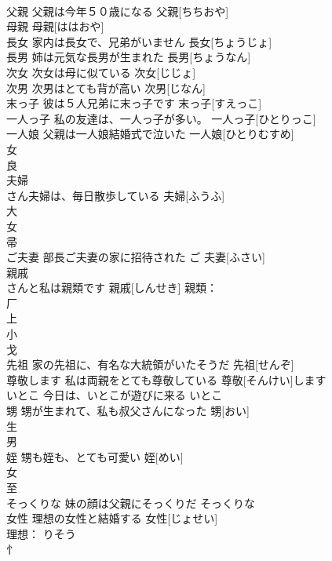 \documentclass[8pt]{extreport}
\begin{document}
\begin{CJK}{UTF8}{min}
\\	父親	父親は今年５０歳になる	父親[ちちおや]			
\\	母親		母親[ははおや]			
\\	長女	家内は長女で、兄弟がいません	長女[ちょうじょ]			
\\	長男	姉は元気な長男が生まれた	長男[ちょうなん]			
\\	次女	次女は母に似ている	次女[じじょ]			
\\	次男	次男はとても背が高い	次男[じなん]			
\\	末っ子	彼は５人兄弟に末っ子です	末っ子[すえっこ]			
\\	一人っ子	私の友達は、一人っ子が多い。	一人っ子[ひとりっこ]			
\\	一人娘	父親は一人娘結婚式で泣いた	一人娘[ひとりむすめ]			
\\	女 
\\	良 
\\	夫婦	
\\	さん夫婦は、毎日散歩している	夫婦[ふうふ]			
\\	大 
\\	女 
\\	帚 
\\	ご夫妻	部長ご夫妻の家に招待された	ご 夫妻[ふさい]			
\\	親戚	
\\	さんと私は親類です	親戚[しんせき]			親類：
\\	厂 
\\	上 
\\	小 
\\	戈 
\\	先祖	家の先祖に、有名な大統領がいたそうだ	先祖[せんぞ]			
\\	尊敬します	私は両親をとても尊敬している	尊敬[そんけい]します			
\\	いとこ	今日は、いとこが遊びに来る	いとこ			
\\	甥	甥が生まれて、私も叔父さんになった	甥[おい]			
\\	生 
\\	男 
\\	姪	甥も姪も、とても可愛い	姪[めい]			
\\	女 
\\	至 
\\	そっくりな	妹の顔は父親にそっくりだ	そっくりな			
\\	女性	理想の女性と結婚する	女性[じょせい]	
\\	理想： りそう
\\	忄 

\end{CJK}
\end{document}
